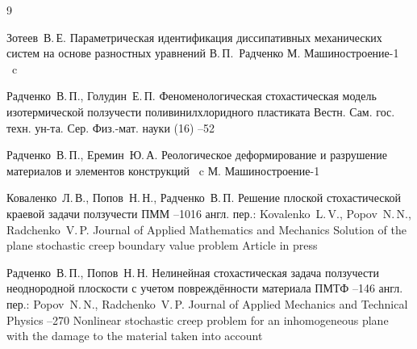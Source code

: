 \begin{thebibliography}{9}


\by Зотеев~В.\,Е.
\book Параметрическая идентификация диссипативных механических систем на основе разностных уравнений
\ed В.\,П.~Радченко
\publaddr М.
\publ Машиностроение-1
~c

\by Радченко~В.\,П., Голудин~Е.\,П.
\paper Феноменологическая стохастическая модель изотермической ползучести поливинилхлоридного пластиката
\jour Вестн. Сам. гос. техн. ун-та. Сер. Физ.-мат. науки
(16)
--52

\by Радченко~В.\,П., Еремин~Ю.\,А.
\book Реологическое деформирование и разрушение материалов и элементов конструкций
~c
\publaddr М.
\publ Машиностроение-1


\by Коваленко~Л.\,В., Попов~Н.\,Н., Радченко~В.\,П.
\paper Решение плоской стохастической краевой задачи ползучести
\jour ПММ
--1016
\transl
англ. пер.:
\by Kovalenko~L.\,V., Popov~N.\,N., Radchenko~V.\,P. 	 	
\jour Journal of Applied Mathematics and Mechanics 
\paper Solution of the plane stochastic creep boundary value problem
\finalinfo Article in press



\by Радченко~В.\,П., Попов~Н.\,Н.
\paper Нелинейная стохастическая задача ползучести неоднородной плоскости с учетом повреждённости материала
\jour ПМТФ
--146
\transl
англ. пер.:
\by Popov~N.\,N., Radchenko~V.\,P. 
\jour Journal of Applied Mechanics and Technical Physics 
--270  
\paper Nonlinear stochastic creep problem for an inhomogeneous plane with the damage to the material taken into account






\end{thebibliography}

\makeengtitle




%
% 
